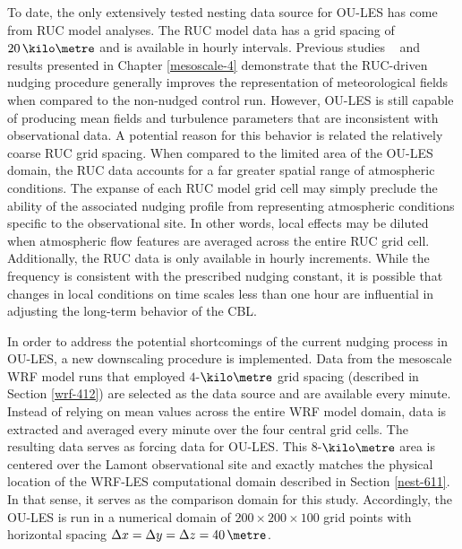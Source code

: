 To date, the only extensively tested nesting data source for OU-LES has come from RUC model analyses. The RUC model data has a grid spacing of $20\, \kilo\metre$ and is available in hourly intervals. Previous studies ~\citep{Botnick2008, Gibbs2008, Gibbs2011} and results presented in Chapter \autoref{mesoscale-4} demonstrate that the RUC-driven nudging procedure generally improves the representation of meteorological fields when compared to the non-nudged control run. However, OU-LES is still capable of producing mean fields and turbulence parameters that are inconsistent with observational data. A potential reason for this behavior is related the relatively coarse RUC grid spacing. When compared to the limited area of the OU-LES domain, the RUC data accounts for a far greater spatial range of atmospheric conditions. The expanse of each RUC model grid cell may simply preclude the ability of the associated nudging profile from representing atmospheric conditions specific to the observational site. In other words, local effects may be diluted when atmospheric flow features are averaged across the entire RUC grid cell. Additionally, the RUC data is only available in hourly increments. While the frequency is consistent with the prescribed nudging constant, it is possible that changes in local conditions on time scales less than one hour are influential in adjusting the long-term behavior of the CBL.

In order to address the potential shortcomings of the current nudging process in OU-LES, a new downscaling procedure is implemented. Data from the mesoscale WRF model runs that employed $4$-$\kilo\metre$ grid spacing (described in Section \autoref{wrf-412}) are selected as the data source and are available every minute. Instead of relying on mean values across the entire WRF model domain, data is extracted and averaged every minute over the four central grid cells. The resulting data serves as forcing data for OU-LES. This $8$-$\kilo\metre$ area is centered over the Lamont observational site and exactly matches the physical location of the WRF-LES computational domain described in Section \autoref{nest-611}. In that sense, it serves as the comparison domain for this study. Accordingly, the OU-LES is run in a numerical domain of $200 \times 200 \times 100$ grid points with horizontal spacing $\Delta x = \Delta y = \Delta z = 40\, \metre$. 

